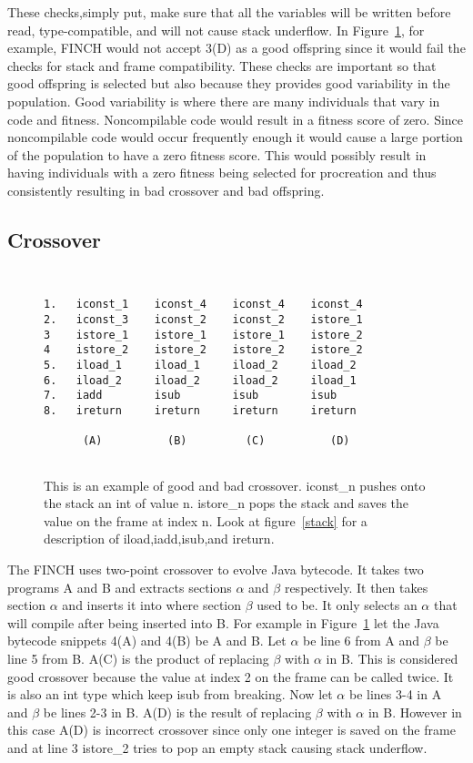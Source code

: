 \documentclass{sig-alternate}
\begin{document}
These checks,simply put, make sure that all the variables will be written before read, type-compatible, and will not cause stack underflow\cite{FINCH2:2009}. In Figure~\ref{crossover}, for example, FINCH would not accept 3(D) as a good offspring since it would fail the checks for stack and frame compatibility.
These checks are important so that good offspring is selected but also because they provides good variability in the population. Good variability is where there are many individuals that vary in code and fitness. Noncompilable code would result in a fitness score of zero. Since noncompilable code would occur frequently enough it would cause a large portion of the population to have a zero fitness score. This would possibly result in having individuals with a zero fitness being selected for procreation and thus consistently resulting in bad crossover and bad offspring.



\subsection{Crossover}

\begin{figure}
\centering
{\tt
\begin{verbatim}
1.   iconst_1    iconst_4    iconst_4    iconst_4
2.   iconst_3    iconst_2    iconst_2    istore_1
3    istore_1    istore_1    istore_1    istore_2
4    istore_2    istore_2    istore_2    istore_2
5.   iload_1     iload_1     iload_2     iload_2
6.   iload_2     iload_2     iload_2     iload_1
7.   iadd        isub        isub        isub
8.   ireturn     ireturn     ireturn     ireturn
                          
      (A)          (B)         (C)          (D)
          
\end{verbatim}
}
\caption{This is an example of good and bad crossover. iconst\_n pushes onto the stack an int of value n. istore\_n pops the stack and saves the value on the frame at index n. Look at figure~\ref{stack} for a description of iload,iadd,isub,and ireturn.}
\label{crossover}
\end{figure}


The FINCH uses two-point crossover to evolve Java bytecode. It takes two programs A and B and extracts sections $\alpha$ and $\beta$ respectively. It then takes section $\alpha$ and inserts it into where section $\beta$ used to be. It only selects an $\alpha$ that will compile after being inserted into B.
For example in Figure~\ref{crossover} let the Java bytecode snippets 4(A) and 4(B) be A and B. Let $\alpha$ be line 6 from A and $\beta$ be line 5 from B. A(C) is the product of replacing $\beta$ with $\alpha$ in B. This is considered good crossover because the value at index 2 on the frame can be called twice. It is also an int type which keep isub from breaking. Now let $\alpha$ be lines 3-4 in A and $\beta$ be lines 2-3 in B. A(D) is the result of replacing $\beta$ with $\alpha$ in B. However in this case A(D) is incorrect crossover since only one integer is saved on the frame and at line 3 istore\_2 tries to pop an empty stack causing stack underflow. 
\end{document}
